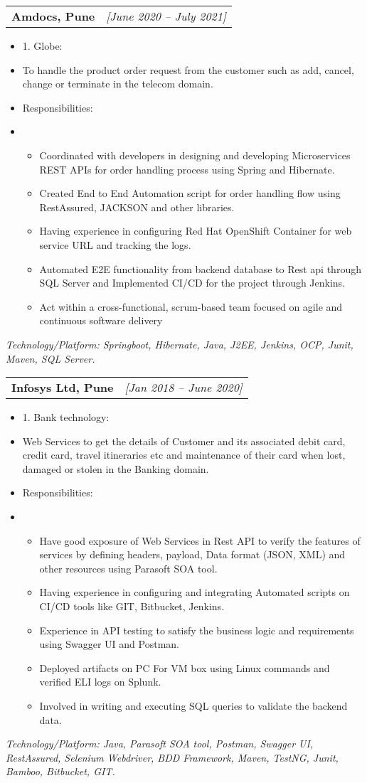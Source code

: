 \documentclass[a4paper,10pt]{article}
\makeatletter
\newcommand{\resitem}[1]{\item #1}
\newcommand{\ressubheading}[3]{\begin{tabular*}{6.62in}{l @{\extracolsep{\fill}} r} \textbf{#1} & \textit{[#2]} \\ \end{tabular*}\vspace{-8pt}}
\makeatother
\begin{document}
\ressubheading{Amdocs, Pune}{June 2020 – July 2021}{Software Engineer}
\begin{itemize}[nosep]
    \resitem{1. Globe:}
    \resitem{To handle the product order request from the customer such as add, cancel, change or terminate in the telecom domain.}
    \resitem{Responsibilities:}
    \resitem{\begin{itemize}
        \item Coordinated with developers in designing and developing Microservices REST APIs for order handling process using Spring and Hibernate.
        \item Created End to End Automation script for order handling flow using RestAssured, JACKSON and other libraries.
        \item Having experience in configuring Red Hat OpenShift Container for web service URL and tracking the logs.
        \item Automated E2E functionality from backend database to Rest api through SQL Server and Implemented CI/CD for the project through Jenkins.
        \item Act within a cross-functional, scrum-based team focused on agile and continuous software delivery
    \end{itemize}}
\end{itemize}
\textit{Technology/Platform: Springboot, Hibernate, Java, J2EE, Jenkins, OCP, Junit, Maven, SQL Server.}

\ressubheading{Infosys Ltd, Pune}{Jan 2018 – June 2020}{System Engineer}
\begin{itemize}[nosep]
    \resitem{1. Bank technology:}
    \resitem{Web Services to get the details of Customer and its associated debit card, credit card, travel itineraries etc and maintenance of their card when lost, damaged or stolen in the Banking domain.}
    \resitem{Responsibilities:}
    \resitem{\begin{itemize}
        \item Have good exposure of Web Services in Rest API to verify the features of services by defining headers, payload, Data format (JSON, XML) and other resources using Parasoft SOA tool.
        \item Having experience in configuring and integrating Automated scripts on CI/CD tools like GIT, Bitbucket, Jenkins.
        \item Experience in API testing to satisfy the business logic and requirements using Swagger UI and Postman.
        \item Deployed artifacts on PC For VM box using Linux commands and verified ELI logs on Splunk.
        \item Involved in writing and executing SQL queries to validate the backend data.
    \end{itemize}}
\end{itemize}
\textit{Technology/Platform: Java, Parasoft SOA tool, Postman, Swagger UI, RestAssured, Selenium Webdriver, BDD Framework, Maven, TestNG, Junit, Bamboo, Bitbucket, GIT.}
\end{document}
